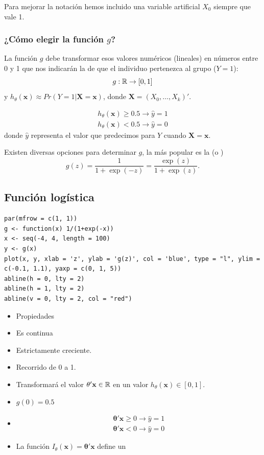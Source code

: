 Para mejorar la notación hemos incluido una variable artificial $X_0$ siempre que vale 1.
\subsubsection{¿Cómo elegir la función $g$?}
La función $g$ debe transformar esos valores numéricos (lineales) en números entre 0 y 1 que nos indicarán la  de que el individuo pertenezca al grupo ($Y=1$): \[ g:\operatorname{\mathbb{R}}\to[0,1] \]y $h_\theta(\mathbf{x})\approx Pr(Y=1|\mathbf{X=x})$, donde $\mathbf{X}=(X_0,\dots,X_k)'$.

 \[ \begin{array}{l}
	h_\theta(\mathbf{x})\ge0.5\to\hat{y}=1\\
	h_\theta(\mathbf{x})<0.5\to\hat{y}=0
\end{array} \]donde $\hat{y}$ representa el valor que predecimos para $Y$ cuando $\mathbf{X=x}$.

Existen diversas opciones para determinar $g$, la más popular es la  (o ) \[ g(z)=\dfrac{1}{1+\exp(-z)}=\dfrac{\exp(z)}{1+\exp(z)}. \]

\subsection{Función logística}
\begin{minipage}{0.5\textwidth}
	\begin{lstlisting}
par(mfrow = c(1, 1))
g <- function(x) 1/(1+exp(-x))
x <- seq(-4, 4, length = 100)
y <- g(x)
plot(x, y, xlab = 'z', ylab = 'g(z)', col = 'blue', type = "l", ylim = c(-0.1, 1.1), yaxp = c(0, 1, 5))
abline(h = 0, lty = 2)
abline(h = 1, lty = 2)
abline(v = 0, lty = 2, col = "red")
\end{lstlisting}
\end{minipage}\qquad\begin{minipage}{0.45\textwidth}
\begin{itemize}[label=\color{red}\textbullet, leftmargin=*]
	\item \color{lightblue}Propiedades
\end{itemize}
\begin{itemize}[label=$-$]
	\item Es continua 
	\item Estrictamente creciente.
	\item Recorrido de 0 a 1.
	\item Transformará el valor $\mathbf{\theta'x}\in\operatorname{\mathbb{R}}$ en un valor $h_\theta(\mathbf{x})\in[0,1]$.
	\item $g(0)=0.5$
	\item {} \[ \begin{array}{l}
		\mathbf{\theta'x}\ge0\to \hat{y}=1\\
		\mathbf{\theta'x}<0\to\hat{y}=0
	\end{array} \]
	\item La función $I_\theta(\mathbf{x})=\mathbf{\theta'x}$ define un 
\end{itemize}
\end{minipage}

